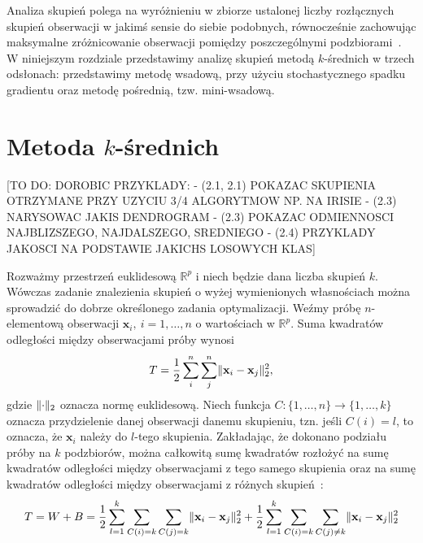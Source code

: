 \documentclass{praca1}
\DeclarePairedDelimiter{\norm}{\lVert}{\rVert}
\begin{document}
Analiza skupień polega na wyróżnieniu w zbiorze ustalonej liczby rozłącznych skupień obserwacji w jakimś sensie do siebie podobnych, równocześnie zachowując maksymalne zróżnicowanie obserwacji pomiędzy poszczególnymi podzbiorami~\cite{Koronacki2005:statystyczne}. W niniejszym rozdziale przedstawimy analizę skupień metodą $k$-średnich w trzech odsłonach: przedstawimy metodę wsadową, przy użyciu stochastycznego spadku gradientu oraz metodę pośrednią, tzw. mini-wsadową.

\section{Metoda $k$-średnich}

[TO DO: DOROBIC PRZYKLADY:
- (2.1, 2.1) POKAZAC SKUPIENIA OTRZYMANE PRZY UZYCIU 3/4 ALGORYTMOW NP. NA IRISIE
- (2.3) NARYSOWAC JAKIS DENDROGRAM
- (2.3) POKAZAC ODMIENNOSCI NAJBLIZSZEGO, NAJDALSZEGO, SREDNIEGO
- (2.4) PRZYKLADY JAKOSCI NA PODSTAWIE JAKICHS LOSOWYCH KLAS]

Rozważmy przestrzeń euklidesową $\mathbb{R}^p$ i niech będzie dana liczba skupień $k$. Wówczas zadanie znalezienia skupień o wyżej wymienionych własnościach można sprowadzić do dobrze określonego zadania optymalizacji. Weźmy próbę $n$-elementową obserwacji $\mathbf{x}_i,\ i = 1,\ldots,n$ o wartościach w $\mathbb{R}^p$. %
Suma kwadratów odległości między obserwacjami próby wynosi~\cite{Koronacki2005:statystyczne}
\begin{equation}
T = \frac{1}{2}\sum\limits_{i}^{n}\sum\limits_{j}^{n} \norm{\mathbf{x}_i - \mathbf{x}_j}_2^2,
\end{equation}
gdzie $\norm{\cdot}_2$ oznacza normę euklidesową. Niech funkcja $C:\{1,\ldots,n\} \rightarrow \{1,\ldots, k\}$ oznacza przydzielenie danej obserwacji danemu skupieniu, tzn. jeśli $C(i) = l$, to oznacza, że $\mathbf{x}_i$ należy do $l$-tego skupienia. Zakładając, że dokonano podziału próby na $k$ podzbiorów, można całkowitą sumę kwadratów rozłożyć na sumę kwadratów odległości między obserwacjami z tego samego skupienia oraz na sumę kwadratów odległości między obserwacjami z różnych skupień~\cite{Koronacki2005:statystyczne}:
\begin{equation}
T = W + B = \frac{1}{2}\sum\limits_{l=1}^{k}\sum\limits_{C(i) = k}\sum\limits_{C(j) = k} \norm{\mathbf{x}_i - \mathbf{x}_j}_2^2 + \frac{1}{2}\sum\limits_{l=1}^{k}\sum\limits_{C(i) = k}\sum\limits_{C(j) \neq k} \norm{\mathbf{x}_i - \mathbf{x}_j}_2^2 
\end{equation}
\end{document}
